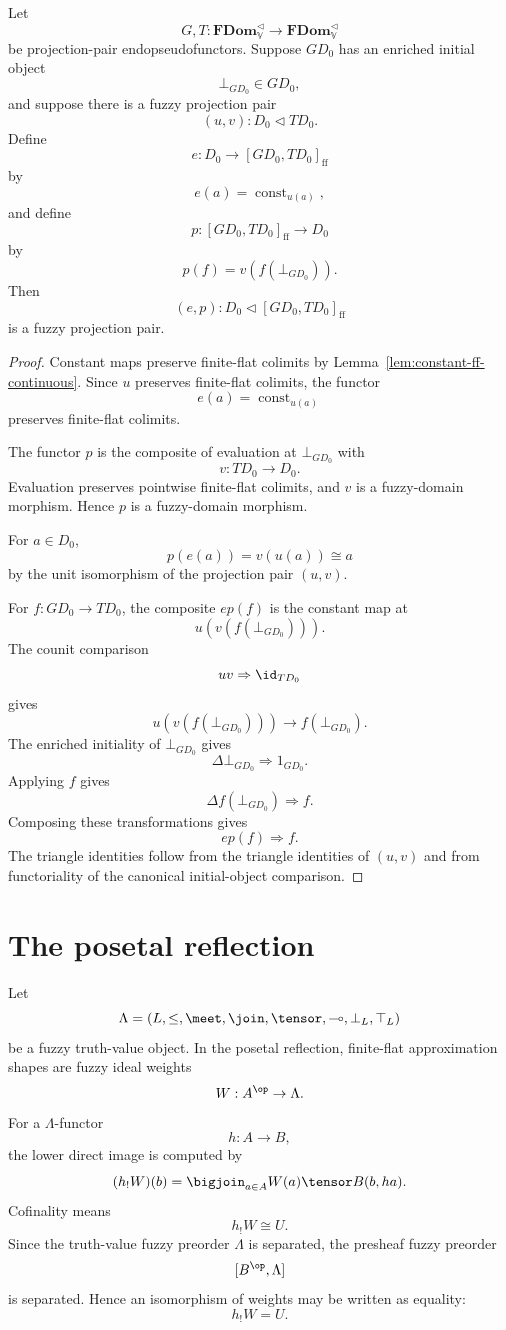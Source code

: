 \begin{proposition}
\label{prop:mixed-constant-map-seed-ff}
Let
\[
    G,T:\mathbf{FDom}_{\mathbb V}^{\triangleleft}
      \to
      \mathbf{FDom}_{\mathbb V}^{\triangleleft}
\]
be projection-pair endopseudofunctors.  Suppose \(GD_0\) has an enriched initial
object
\[
    \bot_{GD_0}\in GD_0,
\]
and suppose there is a fuzzy projection pair
\[
    (u,v):D_0\triangleleft TD_0.
\]
Define
\[
    e:D_0\to[GD_0,TD_0]_{\mathrm{ff}}
\]
by
\[
    e(a)=\operatorname{const}_{u(a)},
\]
and define
\[
    p:[GD_0,TD_0]_{\mathrm{ff}}\to D_0
\]
by
\[
    p(f)=v(f(\bot_{GD_0})).
\]
Then
\[
    (e,p):D_0\triangleleft[GD_0,TD_0]_{\mathrm{ff}}
\]
is a fuzzy projection pair.
\end{proposition}

\begin{proof}
Constant maps preserve finite-flat colimits by
Lemma~\ref{lem:constant-ff-continuous}.  Since \(u\) preserves finite-flat
colimits, the functor
\[
    e(a)=\operatorname{const}_{u(a)}
\]
preserves finite-flat colimits.

The functor \(p\) is the composite of evaluation at \(\bot_{GD_0}\) with
\[
    v:TD_0\to D_0.
\]
Evaluation preserves pointwise finite-flat colimits, and \(v\) is a
fuzzy-domain morphism.  Hence \(p\) is a fuzzy-domain morphism.

For \(a\in D_0\),
\[
    p(e(a))
    =
    v(u(a))
    \cong
    a
\]
by the unit isomorphism of the projection pair \((u,v)\).

For \(f:GD_0\to TD_0\), the composite \(ep(f)\) is the constant map at
\[
    u(v(f(\bot_{GD_0}))).
\]
The counit comparison
\[
    uv\Rightarrow \id_{TD_0}
\]
gives
\[
    u(v(f(\bot_{GD_0})))\to f(\bot_{GD_0}).
\]
The enriched initiality of \(\bot_{GD_0}\) gives
\[
    \Delta\bot_{GD_0}\Rightarrow 1_{GD_0}.
\]
Applying \(f\) gives
\[
    \Delta f(\bot_{GD_0})\Rightarrow f.
\]
Composing these transformations gives
\[
    ep(f)\Rightarrow f.
\]
The triangle identities follow from the triangle identities of \((u,v)\) and
from functoriality of the canonical initial-object comparison.
\end{proof}

\section{The posetal reflection}
\label{sec:posetal-reflection-ff-rde}

Let
\[
    \Lambda=(L,\leq,\meet,\join,\tensor,\multimap,\bot_L,\top_L)
\]
be a fuzzy truth-value object.  In the posetal reflection, finite-flat
approximation shapes are fuzzy ideal weights
\[
    W:A^{\op}\to\Lambda.
\]
For a \(\Lambda\)-functor
\[
    h:A\to B,
\]
the lower direct image is computed by
\[
    (h_!W)(b)
    =
    \bigjoin_{a\in A}
        W(a)\tensor B(b,ha).
\]
Cofinality means
\[
    h_!W\cong U.
\]
Since the truth-value fuzzy preorder \(\Lambda\) is separated, the presheaf
fuzzy preorder
\[
    [B^{\op},\Lambda]
\]
is separated.  Hence an isomorphism of weights may be written as equality:
\[
    h_!W=U.
\]

